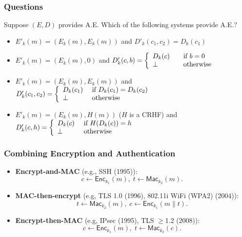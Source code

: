 \begin{frame}\frametitle{Questions}
\begin{exampleblock}{Suppose $(E, D)$ provides A.E. Which of the following systems provide A.E.? }
\begin{itemize}
\item $E'_{k}(m) = \left( E_{k}(m), E_{k}(m)\right)$ and $D'_{k}(c_{1}, c_{2}) = D_{k}(c_{1})$ %
\item $E'_{k}(m) = \left( E_{k}(m), 0\right)$ and %
$ D'_{k}(c, b) = \left\{ 
  \begin{array}{l l}
    D_{k}(c) & \quad \text{if $b = 0$}\\
    \perp & \quad \text{otherwise}\\
  \end{array} \right. $
\item $E'_{k}(m) = \left( E_{k}(m), E_{k}(m)\right)$ and %
$ D'_{k}(c_{1}, c_{2}) = \left\{ 
  \begin{array}{l l}
    D_{k}(c_{1}) & \ \text{if $D_{k}(c_{1}) = D_{k}(c_{2})$}\\
    \perp & \ \text{otherwise}\\
  \end{array} \right. $
\item $E'_{k}(m) = \left( E_{k}(m), H(m)\right)$ ($H$ is a CRHF) and %
$ D'_{k}(c, h) = \left\{ 
  \begin{array}{l l}
    D_{k}(c) & \ \text{if $H(D_{k}(c))=h$}\\
    \perp & \ \text{otherwise}\\
  \end{array} \right. $ 
\end{itemize}
\end{exampleblock}
\end{frame}
\begin{frame}\frametitle{Combining Encryption and Authentication}
\begin{figure}
\begin{center}

\end{center}
\end{figure}
\begin{itemize}
\item \textbf{Encrypt-and-MAC} (e.g., SSH (1995)):\[ c \gets \mathsf{Enc}_{k_1}(m),\; t \gets \mathsf{Mac}_{k_2}(m).\]
\item \textbf{MAC-then-encrypt} (e.g, TLS 1.0 (1996), 802.11i WiFi (WPA2) (2004)):\[ t \gets \mathsf{Mac}_{k_2}(m),\; c \gets \mathsf{Enc}_{k_1}(m\| t).\]
\item \textbf{Encrypt-then-MAC} (e.g, IPsec (1995), TLS  $\ge$1.2 (2008)):\[ c \gets \mathsf{Enc}_{k_1}(m),\; t \gets \mathsf{Mac}_{k_2}(c). \]
\end{itemize}
\end{frame}
